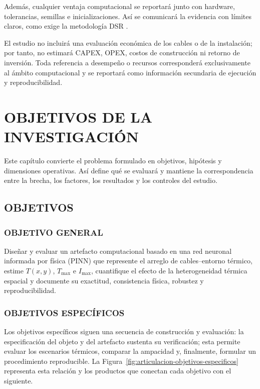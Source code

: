 \documentclass[11pt,a4paper,oneside]{report}
\newcommand{\Tmax}{T_{\max}}
\newcommand{\Imax}{I_{\max}}
\begin{document}
Además, cualquier ventaja computacional se reportará junto con hardware, tolerancias, semillas e inicializaciones. Así se comunicará la evidencia con límites claros, como exige la metodología DSR \parencite[350--351]{gregor2013}.

El estudio no incluirá una evaluación económica de los cables o de la instalación; por tanto, no estimará CAPEX, OPEX, costos de construcción ni retorno de inversión. Toda referencia a desempeño o recursos corresponderá exclusivamente al ámbito computacional y se reportará como información secundaria de ejecución y reproducibilidad.

\chapter{OBJETIVOS DE LA INVESTIGACIÓN}
\thispagestyle{empty}

Este capítulo convierte el problema formulado en objetivos, hipótesis y dimensiones operativas. Así define qué se evaluará y mantiene la correspondencia entre la brecha, los factores, los resultados y los controles del estudio.

\section{OBJETIVOS}

\subsection{OBJETIVO GENERAL}

Diseñar y evaluar un artefacto computacional basado en una red neuronal informada por física (PINN) que represente el arreglo de cables--entorno térmico, estime $T(x,y)$, $\Tmax$ e $\Imax$, cuantifique el efecto de la heterogeneidad térmica espacial y documente su exactitud, consistencia física, robustez y reproducibilidad.

\subsection{OBJETIVOS ESPECÍFICOS}

Los objetivos específicos siguen una secuencia de construcción y evaluación: la especificación del objeto y del artefacto sustenta su verificación; esta permite evaluar los escenarios térmicos, comparar la ampacidad y, finalmente, formular un procedimiento reproducible. La Figura~\ref{fig:articulacion-objetivos-especificos} representa esta relación y los productos que conectan cada objetivo con el siguiente.
\end{document}
